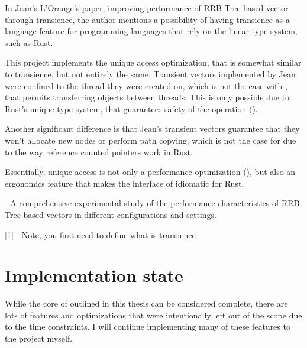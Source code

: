 In Jean's L'Orange's paper, improving performance of RRB-Tree based vector through transience, the author mentions a possibility of having transience as a language feature for programming languages that rely on the linear type system, such as Rust. 

This project implements the unique access optimization, that is somewhat similar to transience, but not entirely the same. Transient vectors implemented by Jean were confined to the thread they were created on, which is not the case with \pvecrs{}, that permits transferring objects between threads. This is only possible due to Rust's unique type system, that guarantees safety of the operation ().

Another significant difference is that Jean's transient vectors guarantee that they won't allocate new nodes or perform path copying, which is not the case for 
\pvecrs{} due to the way reference counted pointers work in Rust. 

Essentially, unique access is not only a performance optimization (), but also an ergonomics feature that makes the interface of \pvecrs{} idiomatic for Rust. 



- A comprehensive experimental study of the performance characteristics of RRB-Tree based vectors in different configurations and settings.

[1] - Note, you first need to define what is transience

\section{Implementation state}

While the core of \pvecrs{} outlined in this thesis can be considered complete, there are lots of features and optimizations that were intentionally left out of the scope due to the time constraints. I will continue implementing many of these features to the project myself. 

